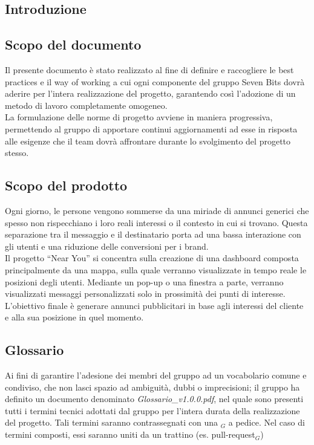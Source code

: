 \documentclass[10pt]{article}
\begin{document}
\newpage
\begin{justify}

\section{Introduzione}
    \subsection{Scopo del documento}
    Il presente documento è stato realizzato al fine di definire e raccogliere le best practices e il way of working a cui ogni componente del gruppo Seven Bits dovrà aderire per l'intera realizzazione del progetto, garantendo così l'adozione di un metodo di lavoro completamente omogeneo.\\
    La formulazione delle norme di progetto avviene in maniera progressiva, permettendo al gruppo di apportare continui aggiornamenti ad esse in risposta alle esigenze che il team dovrà affrontare durante lo svolgimento del progetto stesso.\\

    \subsection{Scopo del prodotto}
    Ogni giorno, le persone vengono sommerse da una miriade di annunci generici che spesso non rispecchiano i loro reali interessi o il contesto in cui si trovano. Questa separazione tra il messaggio e il destinatario porta ad una bassa interazione con gli utenti e una riduzione delle conversioni per i brand.\\
    Il progetto “Near You” si concentra sulla creazione di una dashboard composta principalmente da una mappa, sulla quale verranno visualizzate in tempo reale le posizioni degli utenti. Mediante un pop-up o una finestra a parte, verranno visualizzati messaggi personalizzati solo in prossimità dei punti di interesse.\\
    L'obiettivo finale è generare annunci pubblicitari in base agli interessi del cliente e alla sua posizione in quel momento.\\

    \subsection{Glossario}
    Ai fini di garantire l'adesione dei membri del gruppo ad un vocabolario comune e condiviso, che non lasci spazio ad ambiguità, dubbi o imprecisioni; il gruppo ha definito un documento denominato \textit{Glossario\_v1.0.0.pdf}, nel quale sono presenti tutti i termini tecnici adottati dal gruppo per l'intera durata della realizzazione del progetto. Tali termini saranno contrassegnati con una $_G$ a pedice. Nel caso di termini composti, essi saranno uniti da un trattino (es. pull-request$_G$)


\end{justify}
\end{document}

